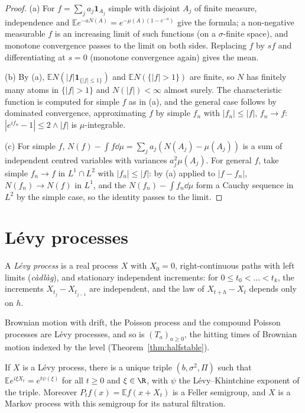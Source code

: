 \begin{proof}
(a) For $f=\sum_ja_j\mathbf 1_{A_j}$ simple with disjoint $A_j$ of finite measure, independence and $\mathbb Ee^{-aN(A)}=e^{-\mu(A)(1-e^{-a})}$ give the formula; a non-negative measurable $f$ is an increasing limit of such
functions (on a $\sigma$-finite space), and monotone convergence passes to the limit on both sides. Replacing $f$ by $sf$ and differentiating at $s=0$ (monotone convergence again) gives the mean.

(b) By (a), $\mathbb EN(|f|\mathbf 1_{\{|f|\le1\}})$ and $\mathbb EN(\{|f|>1\})$ are finite, so $N$ has finitely many atoms in $\{|f|>1\}$ and $N(|f|)<\infty$ almost surely. The characteristic function is computed for simple $f$ as in (a),
and the general case follows by dominated convergence, approximating $f$ by simple $f_n$ with $|f_n|\le|f|$, $f_n\to f$: $|e^{if_n}-1|\le2\wedge|f|$ is $\mu$-integrable.

(c) For simple $f$, $N(f)-\int f\dd\mu=\sum_ja_j(N(A_j)-\mu(A_j))$ is a sum of independent centred variables with variances $a_j^2\mu(A_j)$. For general $f$, take simple $f_n\to f$ in $L^1\cap L^2$ with
$|f_n|\le|f|$: by (a) applied to $|f-f_n|$, $N(f_n)\to N(f)$ in $L^1$, and the $N(f_n)-\int f_n\dd\mu$ form a Cauchy sequence in $L^2$ by the simple case, so the identity passes to the limit.
\end{proof}

\section{L\'evy processes}

\begin{definition}\label{def:levyproc}
A \emph{L\'evy process} is a real process $X$ with $X_0=0$, right-continuous paths with left limits (\emph{c\`adl\`ag}), and stationary independent increments: for $0\le t_0<\dots<t_k$, the increments
$X_{t_j}-X_{t_{j-1}}$ are independent, and the law of $X_{t+h}-X_t$ depends only on $h$.
\end{definition}

Brownian motion with drift, the Poisson process and the compound Poisson processes are L\'evy processes, and so is $(T_a)_{a\ge0}$, the hitting times of Brownian motion indexed by the level (Theorem~\ref{thm:halfstable}).

\begin{proposition}\label{prop:levyexp}
If $X$ is a L\'evy process, there is a unique triple $(b,\sigma^2,\Pi)$ such that $\mathbb Ee^{i\xi X_t}=e^{t\psi(\xi)}$ for all $t\ge0$ and $\xi\in\R$, with $\psi$ the L\'evy--Khintchine exponent of the triple. Moreover $P_tf(x)=\mathbb Ef(x+X_t)$ is a
Feller semigroup, and $X$ is a Markov process with this semigroup for its natural filtration.
\end{proposition}

